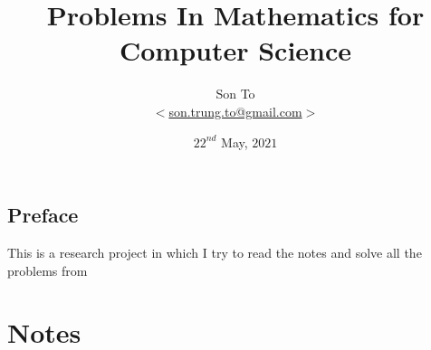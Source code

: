 \documentclass[a4paper,11pt]{memoir}
\theoremstyle{plain} \newtheorem{id}{Lemma}[chapter]
\theoremstyle{definition} \newtheorem{pr}{Problem}[chapter]
\theoremstyle{remark}     \newtheorem{ab}{Remark}[chapter]
\begin{document}
    
    \title{Problems In Mathematics for Computer Science}
    \author{Son To\\
    $<$\href{mailto:son.trung.to@gmail.com}%
    {son.trung.to@gmail.com}$>$}
    \date{$22^{nd}$ May, $2021$}

    \maketitle
    \makeatletter
    \thispagestyle{empty}
    \def\cleardoublepage{\clearpage\if@twoside
        \ifodd\c@page\else
            \hbox{}
            \vspace*{\fill}
            \begin{center}
                \doublenote
            \end{center}
            \vspace*{\fill}
            \thispagestyle{empty}
            \newpage
            \if@twocolumn\hbox{}\newpage\fi
        \fi
    \fi
    }
    \newcommand{\mylabel}[2]{#2\def\@currentlabel{#2}\label{#1}}
    \def\@endpart{\vfill\newpage
        \if@twoside
            \if@openright
                \null
                \thispagestyle{empty}
                \vspace*{\fill}
                \begin{quote}
                    \partnote
                \end{quote}
                \vspace*{\fill}
                \newpage
            \fi
        \fi
        \if@tempswa
            \twocolumn
        \fi
    }
    \newcommand{\partnote}{}
    \newcommand{\doublenote}{}
    \frontmatter
        \chapter{Preface}
            This is a research project in which I try to read
            the notes and solve all the problems
            from \cite{lehman2018}
        \clearpage
        \tableofcontents

    \mainmatter
    \part{Notes}

    
    
\end{document}
